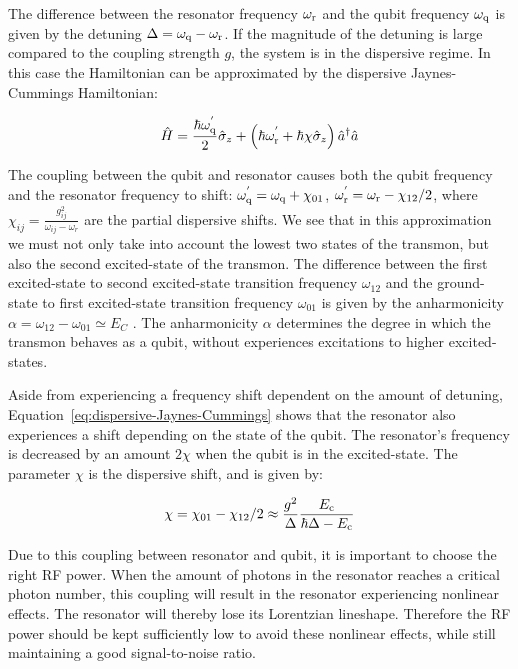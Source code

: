         The difference between the resonator frequency $\omega_\text{r}$ and the qubit frequency $\omega_\text{q}$ is given by the detuning $\Delta = \omega_\text{q} - \omega_\text{r}$. If the magnitude of the detuning is large compared to the coupling strength $g$, the system is in the dispersive regime. In this case the Hamiltonian can be approximated by the dispersive Jaynes-Cummings Hamiltonian:

        \begin{equation}
          \hat{H} = \frac{\hbar \omega_\text{q}^{'}}{2} \hat{\sigma}_z +  \left(\hbar \omega_\text{r}^{'} + \hbar \chi \hat{\sigma}_z\right) \hat{a}^\dagger \hat{a}
          \label{eq:dispersive-Jaynes-Cummings}
        \end{equation}

        The coupling between the qubit and resonator causes both the qubit frequency and the resonator frequency to shift: $\omega_\text{q}^{'} = \omega_\text{q} + \chi_{01}$, $\omega_\text{r}^{'}=\omega_\text{r} - \chi_{12}/2$, where $\chi_{ij} = \frac{g_{ij}^2}{\omega_{ij}-\omega_r}$ are the partial dispersive shifts. We see that in this approximation we must not only take into account the lowest two states of the transmon, but also the second excited-state of the transmon. The difference between the first excited-state to second excited-state transition frequency $\omega_{12}$ and the ground-state to first excited-state transition frequency $\omega_{01}$ is given by the anharmonicity $\alpha=\omega_{12} - \omega_{01} \simeq E_C$ \cite{koch2007Transmon}. The anharmonicity $\alpha$ determines the degree in which the transmon behaves as a qubit, without experiences excitations to higher excited-states.

        Aside from experiencing a frequency shift dependent on the amount of detuning, Equation~\ref{eq:dispersive-Jaynes-Cummings} shows that the resonator also experiences a shift depending on the state of the qubit. The resonator's frequency is decreased by an amount $2 \chi$ when the qubit is in the excited-state. The parameter $\chi$ is the dispersive shift, and is given by:

        \begin{equation}
          \chi = \chi_{01} - \chi_{12}/2 \approx \frac{g^2}{\Delta}\frac{E_\text{c}}{\hbar \Delta - E_\text{c}}
          \label{eq:dispersive-shift}
        \end{equation}

        Due to this coupling between resonator and qubit, it is important to choose the right RF power. When the amount of photons in the resonator reaches a critical photon number, this coupling will result in the resonator experiencing nonlinear effects. The resonator will thereby lose its Lorentzian lineshape. Therefore the RF power should be kept sufficiently low to avoid these nonlinear effects, while still maintaining a good signal-to-noise ratio.

